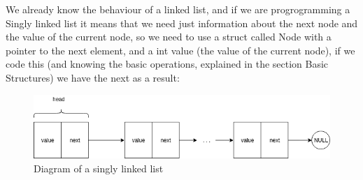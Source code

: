 We already know the behaviour of a linked list, and if we are progrogramming a Singly linked list it means that we need just information about the next node and the value of the current node, so we need to use a struct called Node with a pointer to the next element, and a int value (the value of the current node), if we code this (and knowing the basic operations, explained in the section Basic Structures) we have the next as a result:

\begin{figure}[H]
    \centering
    \includegraphics[width=1.00\textwidth]{Images/DataStructures/LinkedLists/SinglyLinkedList.png}
    \caption{Diagram of a singly linked list}
    \label{fig:singly_linked_list_diagram-01}
\end{figure}

